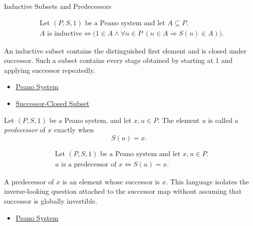 \begin{topicbox}{Inductive Subsets and Predecessors}
\begin{remark*}
\[
\begin{aligned}
&\text{Let } (P,S,1) \text{ be a Peano system and let } A \subseteq P.\\
&A \text{ is inductive}
\Longleftrightarrow
\bigl(1 \in A \land
\forall n \in P\;(n \in A \Longrightarrow S(n) \in A)\bigr).
\end{aligned}
\]
\end{remark*}

\begin{remark*}[Interpretation]
An inductive subset contains the distinguished first element and is closed
under successor. Such a subset contains every stage obtained by starting at
$1$ and applying successor repeatedly.
\end{remark*}

\begin{remark*}[Dependencies]
\begin{itemize}
  \item \hyperref[def:peano-system]{Peano System}
  \item \hyperref[def:successor-closed-subset]{Successor-Closed Subset}
\end{itemize}
\end{remark*}

\begin{tcolorbox}[colback=defbox, colframe=defborder, arc=2pt,
  left=6pt, right=6pt, top=4pt, bottom=4pt,
  title={\small\textbf{Definition (Predecessor in a Peano System)}} ,
  fonttitle=\small\bfseries]
\begin{definition}
\label{def:predecessor-in-peano-system}
Let $(P,S,1)$ be a Peano system, and let $x,u \in P$. The element $u$ is
called a \emph{predecessor} of $x$ exactly when
\[
S(u)=x.
\]
\end{definition}
\end{tcolorbox}

\begin{remark*}
\[
\begin{aligned}
&\text{Let } (P,S,1) \text{ be a Peano system and let } x,u \in P.\\
&u \text{ is a predecessor of } x
\Longleftrightarrow
S(u)=x.
\end{aligned}
\]
\end{remark*}

\begin{remark*}[Interpretation]
A predecessor of $x$ is an element whose successor is $x$. This language
isolates the inverse-looking question attached to the successor map without
assuming that successor is globally invertible.
\end{remark*}

\begin{remark*}[Dependencies]
\begin{itemize}
  \item \hyperref[def:peano-system]{Peano System}
\end{itemize}
\end{remark*}
\end{topicbox}

